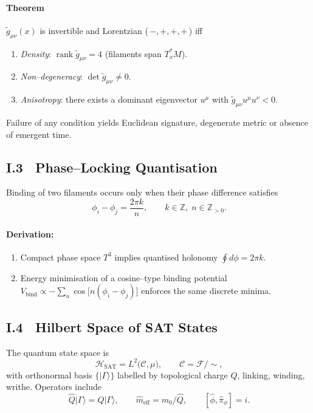 \documentclass[11pt]{article}
\begin{document}
\paragraph{Theorem} $\tilde g_{\mu\nu}(x)$ is invertible and Lorentzian (\,$-,+,+,+$\,) iff
\begin{enumerate}
\item \emph{Density}: $\operatorname{rank}\tilde g_{\mu\nu}=4$ (filaments span $T_x^\ast M$).
\item \emph{Non--degeneracy}: $\det\tilde g_{\mu\nu}\neq0$.
\item \emph{Anisotropy}: there exists a dominant eigenvector $u^\mu$ with
      $\tilde g_{\mu\nu}u^\mu u^\nu<0$.
\end{enumerate}
Failure of any condition yields Euclidean signature, degenerate metric or absence of emergent time.

\subsection{I.3~ Phase--Locking Quantisation}
Binding of two filaments occurs only when their phase difference satisfies
\[
   \phi_i-\phi_j=\frac{2\pi k}{n},\qquad k\in\mathbb Z,\; n\in\mathbb Z_{>0}.
\]
\paragraph{Derivation:}
\begin{enumerate}
\item Compact phase space $T^3$ implies quantised holonomy $\oint d\phi = 2\pi k$.
\item Energy minimisation of a cosine--type binding potential
  $
     V_{\text{bind}}\propto -\!\sum_{n}\cos\bigl[n(\phi_i-\phi_j)\bigr]
  $
  enforces the same discrete minima.
\end{enumerate}

\subsection{I.4~ Hilbert Space of SAT States}
The quantum state space is
\[
    \mathcal H_{\text{SAT}} = L^2\!\bigl(\mathcal C,\mu\bigr),\qquad 
    \mathcal C=\mathcal F/\!\sim,
\]
with orthonormal basis $\{\lvert\Gamma\rangle\}$ labelled by topological charge $Q$, linking, winding, writhe.  
Operators include
\[
   \hat Q\lvert\Gamma\rangle = Q\lvert\Gamma\rangle,\qquad 
   \hat m_{\text{eff}}\!=\!m_0/\hat Q,\qquad 
   [\hat\phi,\hat\pi_\phi]=i.
\]

\end{document}
